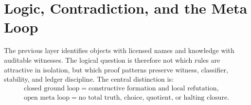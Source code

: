\section{Logic, Contradiction, and the Meta Loop}
\label{sec:visions-philosophy-logic-contradiction-meta-loop}

The previous layer identifies objects with licensed names and
knowledge with auditable witnesses. The logical question is therefore
not which rules are attractive in isolation, but which proof patterns
preserve witness, classifier, stability, and ledger discipline. The
central distinction is:
$$
\begin{gathered}
\text{closed ground loop}=\text{constructive formation and local refutation},\\
\text{open meta loop}=\text{no total truth, choice, quotient, or halting closure}.
\end{gathered}
$$






